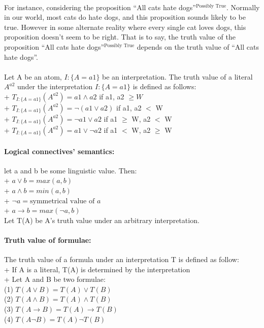 \documentclass[part1.tex]{subfiles}
\begin{document}
\paragraph{} For instance, considering the proposition ``All cats
hate dogs''$^{\text{Possibly True}}$. Normally in our world, most
cats do hate dogs, and this proposition sounds likely to be true.
However in some alternate reality where every single cat
loves dogs, this proposition doesn't seem to be right. That is to
say, the truth value of the proposition ``All cats hate dogs''$^{\text{Possibly True}}$
depends on the truth value of ``All cats hate dogs''.

\paragraph{} Let A be an atom, $I:\{A=a1\}$ be an interpretation.
The truth value of a literal $A^{a2}$ under the interpretation
$I:\{A = a1\}$ is defined as follows:\\
\indent + \(T_{I:\{A = a1\}}(A^{a2}) = a1 \wedge a2 \) if a1, a2 \(\ge W\)\\
\indent + \(T_{I:\{A = a1\}}(A^{a2}) = \neg (a1 \vee a2) \) if a1, a2 \(<\) W\\
\indent + \(T_{I:\{A = a1\}}(A^{a2}) = \neg a1 \vee a2 \) if a1 \(\ge\) W, a2 \(<\) W\\
\indent + \(T_{I:\{A = a1\}}(A^{a2}) =  a1 \vee \neg a2 \) if a1 \(<\) W, a2 \(\ge\) W\\

\paragraph{Logical connectives' semantics:} let a and b be some linguistic value. Then:\\
\indent + \(a \vee b = max(a,b)\)\\
\indent + \(a \wedge b = min(a,b)\)\\
\indent + \(\neg a = \text{symmetrical value of } a\)\\
\indent + \(a \to b = max(\neg a,b)\)\\

Let T(A) be A's truth value under an arbitrary interpretation.\\
\paragraph{Truth value of formulae:} The truth value of a formula
under an interpretation T is defined as follow:\\
\indent + If A is a literal, T(A) is determined by the interpretation\\
\indent + Let A and B be two formulae:\\
\indent \indent (1) \(T(A\vee B) = T(A) \vee T(B)\)\\
\indent \indent (2) \(T(A\wedge B) = T(A) \wedge T(B)\)\\
\indent \indent (3) \(T(A\to B) = T(A) \to T(B)\)\\
\indent \indent (4) \(T(A\neg B) = T(A) \neg T(B)\)
\end{document}

